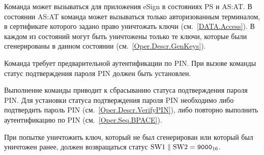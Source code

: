 Команда может вызываться для приложения eSign в состояниях PS и AS:AT.
В состоянии AS:AT команда может вызываться только
авторизованным терминалом, в сертификате которого задано право
уничтожать ключи (см.~\ref{DATA.Access}).
В каждом из состояний могут быть уничтожены только те ключи, которые
были сгенерированы в данном состоянии (см.~\ref{Oper.Descr.GenKeys}).

Команда требует предварительной аутентификации по PIN. 
При вызове команды статус подтверждения пароля PIN 
должен быть установлен.

Выполнение команды приводит к сбрасыванию статуса подтверждения пароля PIN.
Для установки статуса подтверждения пароля PIN 
необходимо либо подтвердить пароль PIN (см.~\ref{Oper.Descr.VerifyPIN}), 
либо повторно выполнить аутентификацию по PIN (см.~\ref{Oper.Seq.BPACE}).

При попытке уничтожить ключ, который не был сгенерирован
или который был уничтожен ранее, должен возвращаться 
статус $\text{SW1} \parallel \text{SW2} = \texttt{9000}_{16}$.
